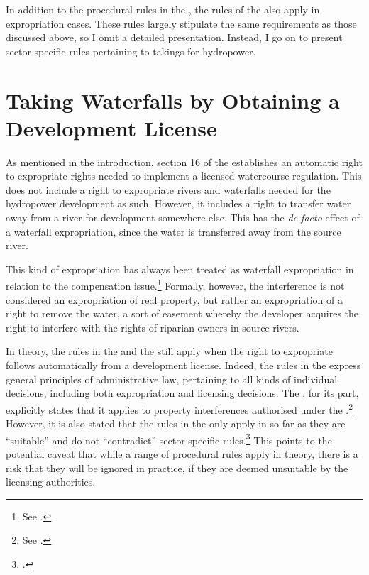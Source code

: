 In addition to the procedural rules in the \cite{ea59}, the rules of the \cite{paa67} also apply in expropriation cases. These rules largely stipulate the same requirements as those discussed above, so I omit a detailed presentation. Instead, I go on to present sector-specific rules pertaining to takings for hydropower. %

\section{Taking Waterfalls by Obtaining a Development License}\label{sec:5:3}

As mentioned in the introduction, section 16 of the \cite{wra17} establishes an automatic right to expropriate rights needed to implement a licensed watercourse regulation. This does not include a right to expropriate rivers and waterfalls needed for the hydropower development as such. However, it includes a right to transfer water away from a river for development somewhere else. This has the {\it de facto} effect of a waterfall expropriation, since the water is transferred away from the source river.

This kind of expropriation has always been treated as waterfall expropriation in relation to the compensation issue.\footnote{See \cite{jorpeland11}.} Formally, however, the interference is not considered an expropriation of real property, but rather an expropriation of a right to remove the water, a sort of easement whereby the developer acquires the right to interfere with the rights of riparian owners in source rivers.

In theory, the rules in the \cite{ea59} and the \cite{paa67} still apply when the right to expropriate follows automatically from a development license. Indeed, the rules in the \cite{paa67} express general principles of administrative law, pertaining to all kinds of individual decisions, including both expropriation and licensing decisions. The \cite{ea59}, for its part, explicitly states that it applies to property interferences authorised under the \cite{wra17}.\footnote{See \dni\cite[30]{ea59}.} However, it is also stated that the rules in the \cite{ea59} only apply in so far as they are ``suitable'' and do not ``contradict'' sector-specific rules.\dni\footcite[30]{ea59} This points to the potential caveat that while a range of procedural rules apply in theory, there is a risk that they will be ignored in practice, if they are deemed unsuitable by the licensing authorities.

